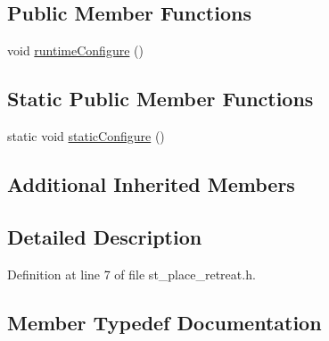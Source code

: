 \subsection*{Public Member Functions}
\begin{DoxyCompactItemize}
\item 
void \hyperlink{structsm__fetch__two__table__pick__n__place__1_1_1place__states_1_1StPlaceRetreat_a4dcdef9108767df1d19da62b5e186a47}{runtime\+Configure} ()
\end{DoxyCompactItemize}
\subsection*{Static Public Member Functions}
\begin{DoxyCompactItemize}
\item 
static void \hyperlink{structsm__fetch__two__table__pick__n__place__1_1_1place__states_1_1StPlaceRetreat_a8328c720fb586c684612935686c38e51}{static\+Configure} ()
\end{DoxyCompactItemize}
\subsection*{Additional Inherited Members}


\subsection{Detailed Description}


Definition at line 7 of file st\+\_\+place\+\_\+retreat.\+h.



\subsection{Member Typedef Documentation}
\mbox{\label{structsm__fetch__two__table__pick__n__place__1_1_1place__states_1_1StPlaceRetreat_a5848487ad7dae4dd59dde554eb9b1e85}} 
